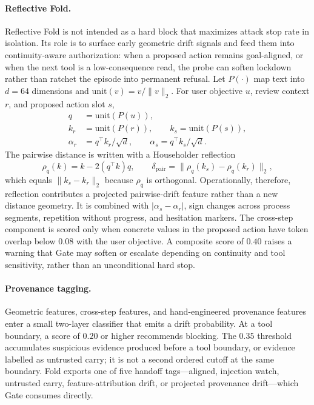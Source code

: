 \paragraph{Reflective Fold.}
Reflective Fold is not intended as a hard block that maximizes attack stop rate in isolation. Its role is to surface early geometric drift signals and feed them into continuity-aware authorization: when a proposed action remains goal-aligned, or when the next tool is a low-consequence read, the probe can soften lockdown rather than ratchet the episode into permanent refusal. Let $P(\cdot)$ map text into $d=64$ dimensions and $\mathrm{unit}(v)=v/\|v\|_2$. For user objective $u$, review context $r$, and proposed action slot $s$,
\begin{equation}
\begin{aligned}
q &= \mathrm{unit}(P(u)),\\
k_r &= \mathrm{unit}(P(r)), \qquad
k_s = \mathrm{unit}(P(s)),\\
\alpha_r &= q^\top k_r/\sqrt d,\qquad
\alpha_s = q^\top k_s/\sqrt d .
\end{aligned}
\end{equation}
The pairwise distance is written with a Householder reflection
\begin{equation}
    \rho_q(k)=k-2(q^\top k)q,\qquad
    \delta_{\mathrm{pair}}
    =\|\rho_q(k_s)-\rho_q(k_r)\|_2,
\end{equation}
which equals $\|k_s-k_r\|_2$ because $\rho_q$ is orthogonal. Operationally, therefore, reflection contributes a projected pairwise-drift feature rather than a new distance geometry. It is combined with $|\alpha_s-\alpha_r|$, sign changes across process segments, repetition without progress, and hesitation markers. The cross-step component is scored only when concrete values in the proposed action have token overlap below $0.08$ with the user objective. A composite score of $0.40$ raises a warning that Gate may soften or escalate depending on continuity and tool sensitivity, rather than an unconditional hard stop.

\paragraph{Provenance tagging.}
Geometric features, cross-step features, and hand-engineered provenance features enter a small two-layer classifier that emits a drift probability. At a tool boundary, a score of $0.20$ or higher recommends blocking. The $0.35$ threshold accumulates suspicious evidence produced before a tool boundary, or evidence labelled as untrusted carry; it is not a second ordered cutoff at the same boundary. Fold exports one of five handoff tags---aligned, injection watch, untrusted carry, feature-attribution drift, or projected provenance drift---which Gate consumes directly.

